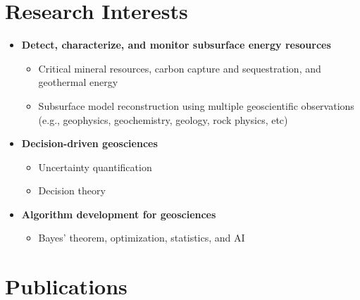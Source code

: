 \documentclass[11pt, a4paper]{article}
\begin{document}
\section*{Research Interests}
\begin{itemize}

	\item \textbf{Detect, characterize, and monitor subsurface energy resources}
	    \begin{itemize}
		\item Critical mineral resources, carbon capture and sequestration, and geothermal energy
		\item Subsurface model reconstruction using multiple geoscientific observations (e.g., geophysics, geochemistry, geology, rock physics, etc)
		\end{itemize}

	\item \textbf{Decision-driven geosciences}
 		\begin{itemize}
		\item Uncertainty quantification
		\item Decision theory
		\end{itemize}
		
	\item \textbf{Algorithm development for geosciences}
		\begin{itemize}
		\item Bayes’ theorem, optimization, statistics, and AI
		\end{itemize}		


\end{itemize}




\section*{Publications}
\end{document}
